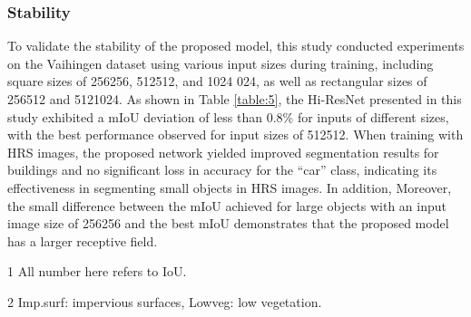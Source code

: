 \documentclass[journal]{IEEEtran}
\begin{document}
\subsubsection{Stability} 
To validate the stability of the proposed model, this study conducted experiments on the Vaihingen dataset using various input sizes during training, including square sizes of 256256, 512512, and 1024 024, as well as rectangular sizes of 256512 and 5121024. As shown in Table \ref{table:5}, the Hi-ResNet presented in this study exhibited a mIoU deviation of less than 0.8\% for inputs of different sizes, with the best performance observed for input sizes of 512512. When training with HRS images, the proposed network yielded improved segmentation results for buildings and no significant loss in accuracy for the ``car'' class, indicating its effectiveness in segmenting small objects in HRS images. In addition, Moreover, the small difference between the mIoU achieved for large objects with an input image size of 256256 and the best mIoU demonstrates that the proposed model has a larger receptive field.


\begin{table}[!ht]
  \begin{center}
  \begin{threeparttable}
        \begin{tablenotes}
        \footnotesize  
        \item[1] All number here refers to IoU.
        \item[2] Imp.surf: impervious surfaces, Lowveg: low vegetation.
        
      \end{tablenotes} 
      \end{threeparttable}
  \end{center}
  \label{table:5}
\end{table}
\end{document}
